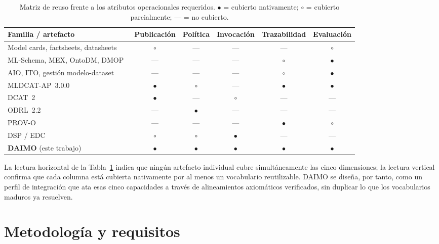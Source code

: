 \documentclass[Afour,sagev,times]{sagej}
\begin{document}
\begin{table}[tb]
\small\sf\centering
\caption{Matriz de reuso frente a los atributos operacionales requeridos. $\bullet$ = cubierto nativamente; $\circ$ = cubierto parcialmente; --- = no cubierto.\label{tab:reuse-matrix}}
\begin{tabular}{@{}lccccc@{}}
\toprule
\textbf{Familia / artefacto} & \textbf{Publicación} & \textbf{Política} & \textbf{Invocación} & \textbf{Trazabilidad} & \textbf{Evaluación} \\
\midrule
Model cards, factsheets, datasheets~\cite{mitchell19,arnold19,gebru21} & $\circ$ & --- & --- & --- & $\circ$ \\
ML-Schema, MEX, OntoDM, DMOP~\cite{mls,mex,ontodm,dmop} & --- & --- & --- & $\circ$ & $\bullet$ \\
AIO, ITO, gestión modelo-dataset~\cite{aio,ito,novacek24} & --- & --- & --- & $\circ$ & $\bullet$ \\
MLDCAT-AP~3.0.0~\cite{mldcatap} & $\bullet$ & $\circ$ & --- & $\bullet$ & $\bullet$ \\
DCAT~2~\cite{dcat2} & $\bullet$ & --- & $\circ$ & --- & --- \\
ODRL~2.2~\cite{odrl22} & --- & $\bullet$ & --- & --- & --- \\
PROV-O~\cite{provo} & --- & --- & --- & $\bullet$ & $\circ$ \\
DSP / EDC~\cite{dsp,edc} & $\circ$ & $\circ$ & $\bullet$ & --- & --- \\
\midrule
\textbf{DAIMO} (este trabajo) & $\bullet$ & $\bullet$ & $\bullet$ & $\bullet$ & $\bullet$ \\
\bottomrule
\end{tabular}
\end{table}

La lectura horizontal de la Tabla~\ref{tab:reuse-matrix} indica que ningún artefacto individual cubre simultáneamente las cinco dimensiones; la lectura vertical confirma que cada columna está cubierta nativamente por al menos un vocabulario reutilizable. DAIMO se diseña, por tanto, como un perfil de integración que ata esas cinco capacidades a través de alineamientos axiomáticos verificados, sin duplicar lo que los vocabularios maduros ya resuelven.

\section{Metodología y requisitos}\label{sec:method}
\end{document}
